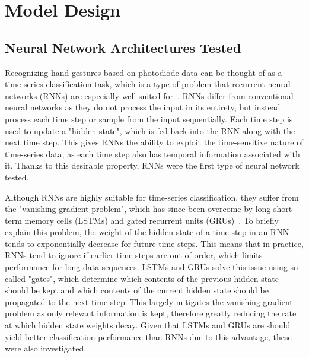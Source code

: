 \section{Model Design}\label{sec:model-design}
\subsection{Neural Network Architectures Tested}\label{subsec:architectures-tested}
Recognizing hand gestures based on photodiode data can be thought of as a time-series classification task, which is a type of problem that recurrent neural networks (RNNs) are especially well suited for~\cite{HUSKEN2003223}.
RNNs differ from conventional neural networks as they do not process the input in its entirety, but instead process each time step or sample from the input sequentially.
Each time step is used to update a "hidden state", which is fed back into the RNN along with the next time step.
This gives RNNs the ability to exploit the time-sensitive nature of time-series data, as each time step also has temporal information associated with it.
Thanks to this desirable property, RNNs were the first type of neural network tested.

Although RNNs are highly suitable for time-series classification, they suffer from the "vanishing gradient problem", which has since been overcome by long short-term memory cells (LSTMs) and gated recurrent units (GRUs)~\cite{DBLP:journals/corr/abs-1801-06105}.
To briefly explain this problem, the weight of the hidden state of a time step in an RNN tends to exponentially decrease for future time steps.
This means that in practice, RNNs tend to ignore if earlier time steps are out of order, which limits performance for long data sequences.
LSTMs and GRUs solve this issue using so-called "gates", which determine which contents of the previous hidden state should be kept and which contents of the current hidden state should be propagated to the next time step.
This largely mitigates the vanishing gradient problem as only relevant information is kept, therefore greatly reducing the rate at which hidden state weights decay.
Given that LSTMs and GRUs are should yield better classification performance than RNNs due to this advantage, these were also investigated.

